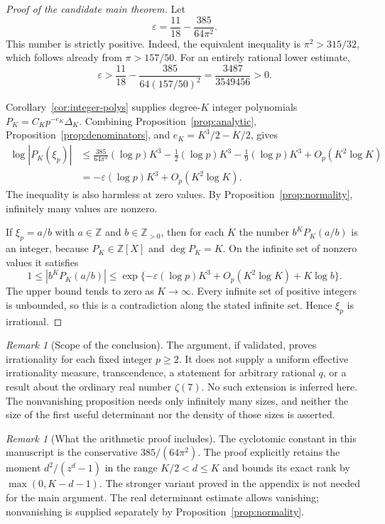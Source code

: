 \documentclass[11pt]{article}
\theoremstyle{remark}
\newtheorem{remark}[theorem]{Remark}
\newcommand{\Z}{\mathbb Z}
\newcommand{\eps}{\varepsilon}
\begin{document}
\begin{proof}[Proof of the candidate main theorem]
Let
\[
 \eps=\frac{11}{18}-\frac{385}{64\pi^2}.
\]
This number is strictly positive. Indeed, the equivalent inequality
is $\pi^2>315/32$, which follows already from $\pi>157/50$.
For an entirely rational lower estimate,
\[
 \eps>
 \frac{11}{18}-\frac{385}{64(157/50)^2}
 =\frac{3487}{3549456}>0.
\]

Corollary~\ref{cor:integer-polys} supplies degree-$K$ integer
polynomials $P_K=C_Kp^{-e_K}\Delta_K$.
Combining Proposition~\ref{prop:analytic},
Proposition~\ref{prop:denominators}, and $e_K=K^3/2-K/2$, gives
\begin{align*}
 \log|P_K(\xi_p)|
 &\le\frac{385}{64\pi^2}(\log p)K^3
       -\frac12(\log p)K^3-\frac19(\log p)K^3
       +O_p(K^2\log K)\\
 &=-\eps(\log p)K^3+O_p(K^2\log K).
\end{align*}
The inequality is also harmless at zero values. By
Proposition~\ref{prop:normality}, infinitely many values are nonzero.

If $\xi_p=a/b$ with $a\in\Z$ and $b\in\Z_{>0}$, then for each $K$
the number $b^KP_K(a/b)$ is an integer, because $P_K\in\Z[X]$ and
$\deg P_K=K$. On the infinite set of nonzero values it satisfies
\[
 1\le |b^KP_K(a/b)|
 \le\exp\{-\eps(\log p)K^3+O_p(K^2\log K)+K\log b\}.
\]
The upper bound tends to zero as $K\to\infty$. Every infinite set
of positive integers is unbounded, so this is a contradiction along
the stated infinite set. Hence $\xi_p$ is irrational.
\end{proof}

\begin{remark}[Scope of the conclusion]
The argument, if validated, proves irrationality for each fixed
integer $p\ge2$. It does not supply a uniform effective irrationality
measure, transcendence, a statement for arbitrary rational $q$, or
a result about the ordinary real number $\zeta(7)$. No such extension
is inferred here. The nonvanishing proposition needs only infinitely
many sizes, and neither the size of the first useful determinant nor
the density of those sizes is asserted.
\end{remark}

\begin{remark}[What the arithmetic proof includes]
The cyclotomic constant in this manuscript is the conservative
$385/(64\pi^2)$. The proof explicitly retains the moment
$d^2/(z^d-1)$ in the range $K/2<d\le K$ and bounds its exact rank
by $\max(0,K-d-1)$. The stronger variant proved in the appendix
is not needed for the main argument. The real determinant estimate
allows vanishing; nonvanishing is supplied separately by
Proposition~\ref{prop:normality}.
\end{remark}
\end{document}
